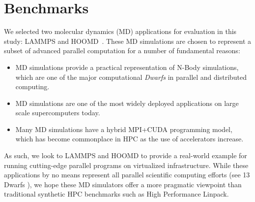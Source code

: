 



\section{Benchmarks}\label{benchmarks}
We selected two molecular dynamics (MD) applications for evaluation in this study:
LAMMPS and HOOMD~\cite{plimpton2007lammps,anderson2010hoomd}.  These MD simulations are chosen to represent a subset of advanced parallel computation for a number of fundamental reasons:

\begin{itemize}
\item MD simulations provide a practical representation of N-Body simulations, which are one of the major computational \emph{Dwarfs} \cite{asanovic2006landscape} in parallel and distributed computing. 
\item MD simulations are one of the most widely deployed applications on large scale supercomputers today.
\item Many MD simulations have a hybrid MPI+CUDA programming model, which has become commonplace in HPC as the use of accelerators increase.
\end{itemize}

As such, we look to LAMMPS and HOOMD to provide a real-world example for running cutting-edge parallel programs on virtualized infrastructure. While these applications by no means represent all parallel scientific computing efforts (see 13 Dwarfs \cite{asanovic2006landscape}), we hope these MD simulators offer a more pragmatic viewpoint than traditional synthetic HPC benchmarks such as High Performance Linpack. 

